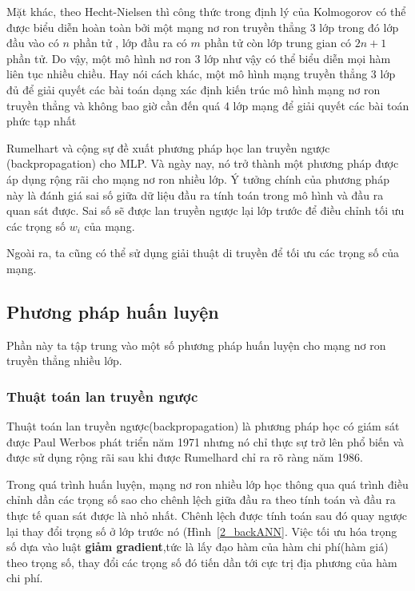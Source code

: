 Mặt khác, theo Hecht-Nielsen \citep{hec87} thì công thức trong định lý của Kolmogorov có thể được biểu diễn hoàn toàn bởi một mạng nơ ron truyền thẳng 3 lớp trong đó lớp đầu vào có $n$ phần tử , lớp đầu ra có $m$ phần tử còn lớp trung gian có $2n+1$ phần tử. Do vậy, một mô hình nơ ron 3 lớp như vậy có thể biểu diễn mọi hàm liên tục nhiều chiều. Hay nói cách khác, một mô hình mạng truyền thẳng 3 lớp đủ để giải quyết các bài toán dạng xác định kiến trúc mô hình mạng nơ ron truyền thẳng \citep{lip87} và không bao giờ cần đến quá 4 lớp mạng để giải quyết các bài toán phức tạp nhất \citep{cyb88}

Rumelhart và cộng sự \citep{rum86} đề xuất phương pháp học lan truyền ngược (backpropagation) cho MLP. Và ngày nay, nó trở thành một phương pháp được áp dụng rộng rãi cho mạng nơ ron nhiều lớp. Ý tưởng chính của phương pháp này là đánh giá sai số giữa dữ liệu đầu ra tính toán trong mô hình và đầu ra quan sát được. Sai số sẽ được lan truyền ngược lại lớp trước để điều chỉnh tối ưu các trọng số $w_i$ của mạng. 

Ngoài ra, ta cũng có thể sử dụng giải thuật di truyền để tối ưu các trọng số của mạng. 

\subsection{Phương pháp huấn luyện}
Phần này ta tập trung vào một số phương pháp huấn luyện cho mạng nơ ron truyền thẳng nhiều lớp.
\subsubsection{Thuật toán lan truyền ngược}
Thuật toán lan truyền ngược(backpropagation) là phương pháp học có giám sát được Paul Werbos phát triển năm 1971 nhưng nó chỉ thực sự trở lên phổ biến và được sử dụng rộng rãi sau khi được Rumelhard \citep{rum86} chỉ ra rõ ràng năm 1986. 
	
	Trong quá trình huấn luyện, mạng nơ ron nhiều lớp học thông qua quá trình điều chỉnh dần các trọng số sao cho chênh lệch giữa đầu ra theo tính toán và đầu ra thực tế quan sát được là nhỏ nhất. Chênh lệch được tính toán sau đó quay ngược lại thay đổi trọng số ở lớp trước nó (Hình~\ref{2_backANN}. Việc tối ưu hóa trọng số dựa vào luật \textbf{giảm gradient},tức là lấy đạo hàm của hàm chi phí(hàm giá) theo trọng số, thay đổi các trọng số đó tiến dần tới cực trị địa phương của hàm chi phí.
	

